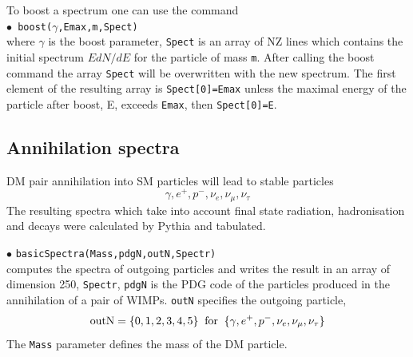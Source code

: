 \documentclass[12pt,a4paper]{article}
\begin{document}
To boost a spectrum one can use the command \\
$\bullet$\verb| boost(|$\gamma$\verb|,Emax,m,Spect)|\\
where $\gamma$ is the boost parameter, {\tt Spect} is an array of NZ lines which contains the initial spectrum $E dN/dE$ for the particle of mass \verb|m|. After calling the boost command  the array  {\tt Spect} will be overwritten with the new spectrum. The first element of the resulting array is {\tt Spect[0]=Emax} unless the maximal energy of the particle after boost, E,  exceeds {\tt Emax}, then {\tt Spect[0]=E}.



\subsection{Annihilation spectra}

DM pair  annihilation into  SM particles will lead to stable particles
\begin{equation}
\label{outN} 
  \gamma,   e^+,  p^-, \nu_e, \nu_{\mu},\nu_{\tau}
\end{equation}
The resulting spectra which take into account final state radiation, hadronisation  and decays were  calculated by Pythia and tabulated. 

\noindent
$\bullet$ \verb|basicSpectra(Mass,pdgN,outN,Spectr)|\\
computes the spectra of outgoing particles and writes the result in an array of dimension 250, \verb|Spectr|,
\verb|pdgN| is the PDG code of the particles produced in the annihilation of a pair of 
WIMPs.  \verb|outN|  specifies the outgoing particle,
$$ {\rm outN} = \{0,1,2,3,4,5\} \;\; {\rm for}\;\; \{\gamma,   e^+,  p^-, \nu_e,
\nu_{\mu},\nu_{\tau}\} $$
The {\tt Mass} parameter defines the mass of the DM particle.\\
\end{document}
